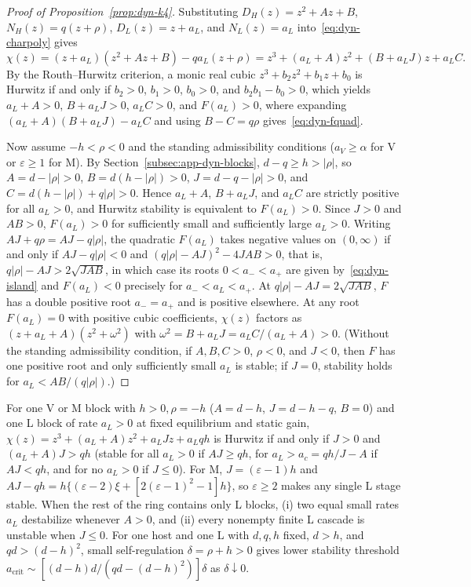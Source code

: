 \begin{proof}[Proof of Proposition~{\upshape\ref{prop:dyn-k4}}]
Substituting $D_H(z) = z^2 + Az + B$, $N_H(z) = q(z + \rho)$, $D_L(z) = z + a_L$, and $N_L(z) = a_L$ into~\eqref{eq:dyn-charpoly} gives
\[
\chi(z) = (z + a_L)(z^2 + Az + B) - qa_L(z + \rho) = z^3 + (a_L + A)z^2 + (B + a_L J)z + a_L C.
\]
By the Routh--Hurwitz criterion, a monic real cubic $z^3 + b_2 z^2 + b_1 z + b_0$ is Hurwitz if and only if $b_2 > 0$, $b_1 > 0$, $b_0 > 0$, and $b_2 b_1 - b_0 > 0$, which yields $a_L + A > 0$, $B + a_L J > 0$, $a_L C > 0$, and $F(a_L) > 0$, where expanding $(a_L + A)(B + a_L J) - a_L C$ and using $B - C = q\rho$ gives~\eqref{eq:dyn-fquad}.

Now assume $-h < \rho < 0$ and the standing admissibility conditions ($a_V \ge \alpha$ for V or $\varepsilon \ge 1$ for M). By Section~\ref{subsec:app-dyn-blocks}, $d - q \ge h > |\rho|$, so $A = d - |\rho| > 0$, $B = d(h - |\rho|) > 0$, $J = d - q - |\rho| > 0$, and $C = d(h - |\rho|) + q|\rho| > 0$. Hence $a_L + A$, $B + a_L J$, and $a_L C$ are strictly positive for all $a_L > 0$, and Hurwitz stability is equivalent to $F(a_L) > 0$. Since $J > 0$ and $AB > 0$, $F(a_L) > 0$ for sufficiently small and sufficiently large $a_L > 0$. Writing $AJ + q\rho = AJ - q|\rho|$, the quadratic $F(a_L)$ takes negative values on $(0, \infty)$ if and only if $AJ - q|\rho| < 0$ and $(q|\rho| - AJ)^2 - 4JAB > 0$, that is, $q|\rho| - AJ > 2\sqrt{JAB}$, in which case its roots $0 < a_- < a_+$ are given by~\eqref{eq:dyn-island} and $F(a_L) < 0$ precisely for $a_- < a_L < a_+$. At $q|\rho| - AJ = 2\sqrt{JAB}$, $F$ has a double positive root $a_- = a_+$ and is positive elsewhere. At any root $F(a_L) = 0$ with positive cubic coefficients, $\chi(z)$ factors as $(z + a_L + A)(z^2 + \omega^2)$ with $\omega^2 = B + a_L J = a_L C/(a_L + A) > 0$. (Without the standing admissibility condition, if $A, B, C > 0$, $\rho < 0$, and $J < 0$, then $F$ has one positive root and only sufficiently small $a_L$ is stable; if $J = 0$, stability holds for $a_L < AB/(q|\rho|)$.)
\end{proof}

\begin{proposition}\label{prop:dyn-k5}
For one V or M block with $h > 0, \rho = -h$ ($A = d - h$, $J = d - h - q$, $B = 0$) and one L block of rate $a_L > 0$ at fixed equilibrium and static gain, $\chi(z) = z^3 + (a_L + A)z^2 + a_L J z + a_L qh$ is Hurwitz if and only if $J > 0$ and $(a_L + A)J > qh$ (stable for all $a_L > 0$ if $AJ \ge qh$, for $a_L > a_c = qh/J - A$ if $AJ < qh$, and for no $a_L > 0$ if $J \le 0$). For M, $J = (\varepsilon - 1)h$ and $AJ - qh = h\{(\varepsilon - 2)\xi + [2(\varepsilon - 1)^2 - 1]h\}$, so $\varepsilon \ge 2$ makes any single L stage stable. When the rest of the ring contains only L blocks, (i) two equal small rates $a_L$ destabilize whenever $A > 0$, and (ii) every nonempty finite L cascade is unstable when $J \le 0$. For one host and one L with $d, q, h$ fixed, $d > h$, and $qd > (d - h)^2$, small self-regulation $\delta = \rho + h > 0$ gives lower stability threshold $a_{\mathrm{crit}} \sim [(d - h)d/(qd - (d - h)^2)]\delta$ as $\delta \downarrow 0$.
\end{proposition}

